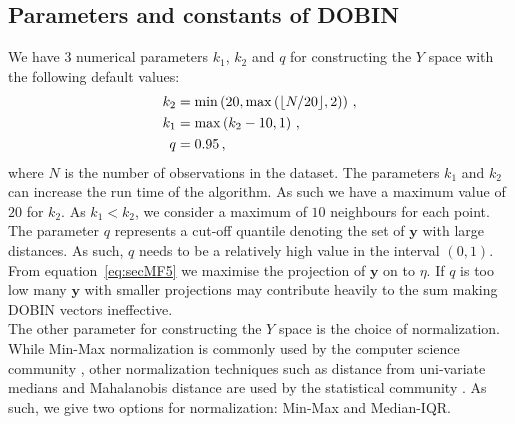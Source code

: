 \documentclass[11pt]{article}
\begin{document}
\subsection{Parameters and constants of DOBIN}\label{sec:MathFrame4}
We have $3$ numerical parameters $k_1$, $k_2$ and $q$ for constructing the $Y$ space with the following default values:
\begin{align} \label{eq:secMF15}
   k_2  & = \min\left(20, \max \left( \lfloor N/20 \rfloor ,2 \right )  \right) \notag  \, , \\
   k_1  & = \max \left( k_2-10, 1 \right) \, , \\
   q    & = 0.95 \notag \, , 
\end{align}
where $N$ is the number of observations in the dataset. The parameters $k_1$ and $k_2$ can increase the run time of the algorithm. As such we have a maximum value of $20$ for $k_2$.  As $k_1 < k_2$, we consider a maximum of $10$ neighbours for each point. The parameter $q$ represents a  cut-off quantile denoting the set of $\bm{y}$ with large distances. As such, $q$ needs to be a relatively high value in the interval $(0,1)$. From equation~\eqref{eq:secMF5} we maximise the projection of $\bm{y}$ on to $\eta$. If $q$ is too low many $\bm{y}$ with smaller projections may contribute heavily to the sum making DOBIN vectors ineffective.  \\

The other parameter for constructing the $Y$ space is the choice of normalization. While Min-Max normalization is commonly used by the computer science community \citep{campos2016evaluation}, other normalization techniques such as distance from uni-variate medians and Mahalanobis distance are used by the statistical community \citep{billor2000bacon}.  As such, we give two options for normalization: Min-Max and Median-IQR.  \\
\end{document}
